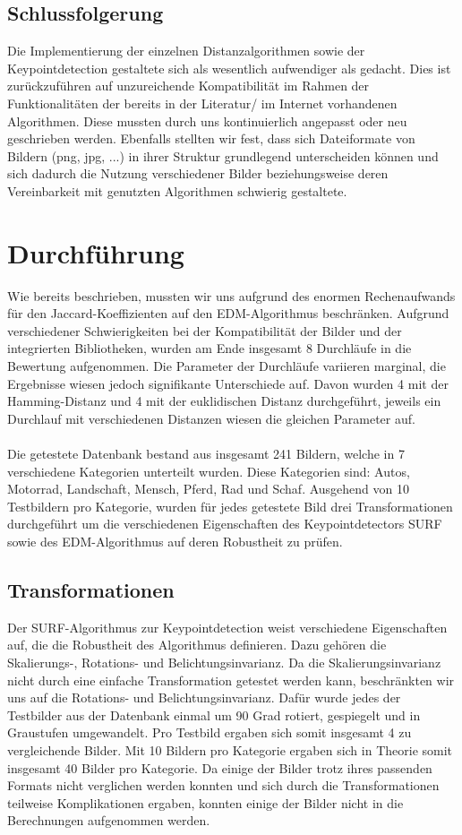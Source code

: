 \documentclass{scrartcl}
\begin{document}
\subsection{Schlussfolgerung}
Die Implementierung der einzelnen Distanzalgorithmen sowie der Keypointdetection gestaltete sich als wesentlich aufwendiger als gedacht. Dies ist zurückzuführen auf unzureichende Kompatibilität im Rahmen der Funktionalitäten der bereits in der Literatur/ im Internet vorhandenen Algorithmen. Diese mussten durch uns kontinuierlich angepasst oder neu geschrieben werden. Ebenfalls stellten wir fest, dass sich Dateiformate von Bildern (png, jpg, ...) in ihrer Struktur grundlegend unterscheiden können und sich dadurch die Nutzung verschiedener Bilder beziehungsweise deren Vereinbarkeit mit genutzten Algorithmen schwierig gestaltete. 

\section{Durchführung}
Wie bereits beschrieben, mussten wir uns aufgrund des enormen Rechenaufwands für den Jaccard-Koeffizienten auf den EDM-Algorithmus beschränken. Aufgrund verschiedener Schwierigkeiten bei der Kompatibilität der Bilder und der integrierten Bibliotheken, wurden am Ende insgesamt 8 Durchläufe in die Bewertung aufgenommen. Die Parameter der Durchläufe variieren marginal, die Ergebnisse wiesen jedoch signifikante Unterschiede auf. Davon wurden 4 mit der Hamming-Distanz und 4 mit der euklidischen Distanz durchgeführt, jeweils ein Durchlauf mit verschiedenen Distanzen wiesen die gleichen Parameter auf.
\\
\\
Die getestete Datenbank bestand aus insgesamt 241 Bildern, welche in 7 verschiedene Kategorien unterteilt wurden. Diese Kategorien sind: Autos, Motorrad, Landschaft, Mensch, Pferd, Rad und Schaf. Ausgehend von 10 Testbildern pro Kategorie, wurden für jedes getestete Bild drei Transformationen durchgeführt um die verschiedenen Eigenschaften des Keypointdetectors SURF sowie des EDM-Algorithmus auf deren Robustheit zu prüfen. 

\subsection{Transformationen}
Der SURF-Algorithmus zur Keypointdetection weist verschiedene Eigenschaften auf, die die Robustheit des Algorithmus definieren. Dazu gehören die Skalierungs-, Rotations- und Belichtungsinvarianz. Da die Skalierungsinvarianz nicht durch eine einfache Transformation getestet werden kann, beschränkten wir uns auf die Rotations- und Belichtungsinvarianz. Dafür wurde jedes der Testbilder aus der Datenbank einmal um 90 Grad rotiert, gespiegelt und in Graustufen umgewandelt. Pro Testbild ergaben sich somit insgesamt 4 zu vergleichende Bilder. Mit 10 Bildern pro Kategorie ergaben sich in Theorie somit insgesamt 40 Bilder pro Kategorie. Da einige der Bilder trotz ihres passenden Formats nicht verglichen werden konnten und sich durch die Transformationen teilweise Komplikationen ergaben, konnten einige der Bilder nicht in die Berechnungen aufgenommen werden.
\end{document}

